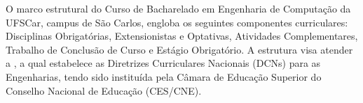 
O marco estrutural do Curso de Bacharelado em Engenharia de Computação da UFSCar, campus de São Carlos, engloba os seguintes componentes curriculares: Disciplinas Obrigatórias, Extensionistas e Optativas,  Atividades Complementares, Trabalho de Conclusão de Curso e Estágio Obrigatório. A estrutura visa atender a , a qual estabelece as Diretrizes Curriculares Nacionais (DCNs) para as Engenharias, tendo sido instituída pela Câmara de Educação Superior do Conselho Nacional de Educação (CES/CNE).




